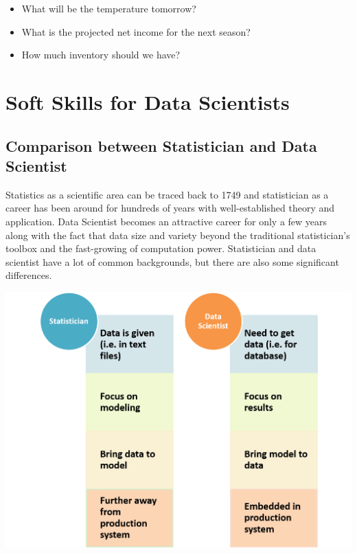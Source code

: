 \documentclass[12pt,]{krantz}
\providecommand{\tightlist}{%
  \setlength{\itemsep}{0pt}\setlength{\parskip}{0pt}}
\theoremstyle{definition}
\theoremstyle{definition}
\theoremstyle{definition}
\theoremstyle{remark}
\begin{document}
\begin{itemize}
\tightlist
\item
  What will be the temperature tomorrow?
\item
  What is the projected net income for the next season?
\item
  How much inventory should we have?
\end{itemize}

\chapter{Soft Skills for Data
Scientists}\label{soft-skills-for-data-scientists}

\section{Comparison between Statistician and Data
Scientist}\label{comparison-between-statistician-and-data-scientist}

Statistics as a scientific area can be traced back to 1749 and
statistician as a career has been around for hundreds of years with
well-established theory and application. Data Scientist becomes an
attractive career for only a few years along with the fact that data
size and variety beyond the traditional statistician's toolbox and the
fast-growing of computation power. Statistician and data scientist have
a lot of common backgrounds, but there are also some significant
differences.

\includegraphics{images/softskill1.png}
\end{document}
